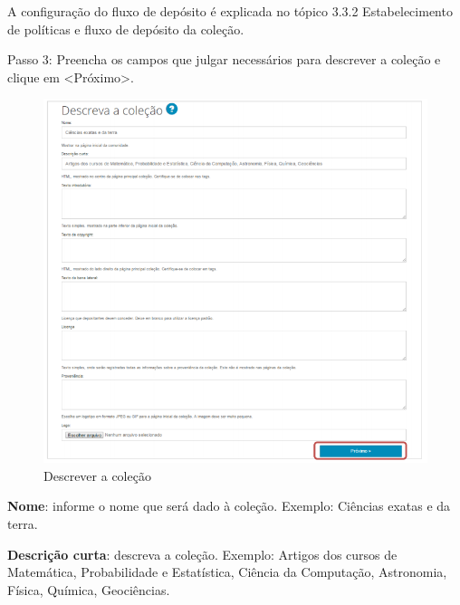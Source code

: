 \documentclass[12pt,hidelinks]{article}
\begin{document}
    \singlespacing
    
    A configuração do fluxo de depósito é explicada no tópico 3.3.2 Estabelecimento de políticas e fluxo de depósito da coleção. 
    
    \singlespacing
    
    Passo 3: Preencha os campos que julgar necessários para descrever a coleção e clique em <Próximo>.
    
    \begin{figure}[!htp]
                \centering
                \includegraphics[scale=0.7]{figura/Figura35.png}
                \caption{Descrever a coleção}
            \label{Rotulo}
        \end{figure}

\newpage

    \singlespacing 
     
    \textbullet \hspace{6pt} \textbf{Nome}: informe o nome que será dado à coleção. Exemplo: Ciências exatas e da terra.
     
    \singlespacing
     
    \textbullet \hspace{6pt} \textbf{Descrição curta}: descreva a coleção. Exemplo: Artigos dos cursos de Matemática, Probabilidade e Estatística, Ciência da Computação, Astronomia, Física, Química, Geociências.
    
\end{document}
